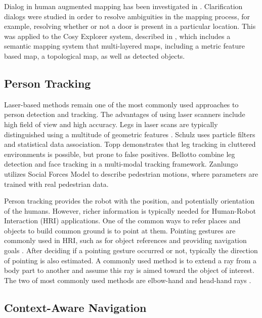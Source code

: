 \documentclass[3p]{elsarticle}
\begin{document}
Dialog in human augmented mapping has been investigated in \cite{kruijff2006clarification}. 
Clarification dialogs were studied in order to resolve ambiguities in the mapping process,
for example, resolving whether or not a door is present in a particular location. This was applied to the Cosy Explorer system, described in \cite{zender2007integrated}, 
which includes a semantic mapping system that multi-layered maps, including a metric feature based
map, a topological map, as well as detected objects.

\subsection{Person Tracking}
\label{sec:rel_person_tracking}

Laser-based methods remain one of the most commonly used approaches to person detection and tracking. 
The advantages of using laser scanners include high field of view and high accuracy. Legs in laser scans are typically distinguished using a multitude of geometric features \cite{arras2007using}. 
Schulz \cite{schulz2001tracking} uses particle filters and statistical data association.
Topp \cite{topp2005tracking} demonstrates that leg tracking in cluttered
environments is possible, but prone to false positives. Bellotto \cite{bellotto2009multisensor} combine leg detection 
and face tracking in a multi-modal tracking framework. Zanlungo \cite{zanlungo2011social} utilizes Social Forces Model to describe pedestrian motions, where parameters are trained with real pedestrian data. 

Person tracking provides the robot with the position, and potentially orientation of the humans.
However, richer information is typically needed for Human-Robot Interaction (HRI) applications. 
One of the common ways to refer places and objects to build common ground is to point at them. 
Pointing gestures are commonly used in HRI, such as for object references \cite{schmidt2008interacting} and providing navigation goals \cite{van2011real}. After deciding if a pointing gesture occurred or not, typically the direction of pointing
is also estimated. A commonly used method is to extend a ray from a body part to another and assume this ray is aimed toward the object of interest. The two of most commonly used methods are elbow-hand \cite{brooks2006working} and head-hand rays \cite{schmidt2008interacting}.

\subsection{Context-Aware Navigation}
\label{sec:rel_context_aware_navigation}
\end{document}

